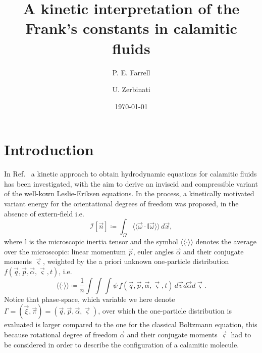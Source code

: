 \documentclass[%
 aip,
 amsmath,amssymb,
 reprint,%
]{revtex4-1}
\newcommand{\cchevrons}[1]{\langle\!\langle #1 \rangle\!\rangle}
\begin{document}

\title[]{A kinetic interpretation of the Frank's constants in calamitic fluids}
\author{P. E. Farrell}
\author{U. Zerbinati}

\date{\today}%

\begin{abstract}
\end{abstract}

\maketitle

\section{\label{sec:intro}Introduction}
In Ref.~ a kinetic approach to obtain hydrodynamic equations for calamitic fluids has been investigated, with the aim to derive an inviscid and compressible variant of the well-kown Leslie-Eriksen equations.
In the process, a kinetically motivated variant energy for the orientational degrees of freedom was proposed, in the absence of extern-field i.e.
\begin{equation}
\label{eq:OseenFrankGen}
\mathcal{I}[\vec{n}]\coloneqq \int_{\Omega} \cchevrons{\vec{\omega} \cdot \mathbb{I}\vec{\omega}}\,d\vec{x},
\end{equation}
where $\mathbb{I}$ is the microscopic inertia tensor and the symbol $\cchevrons{\cdot}$ denotes the average over the microscopic: linear momentum $\vec{p}$, euler angles $\vec{\alpha}$ and their conjugate moments $\vec{\varsigma}$, weighted by the a priori unknown one-particle distribution $f(\vec{q},\vec{p},\vec{\alpha},\vec{\varsigma},t)$, i.e.~
\begin{equation}
	\cchevrons{\cdot} \coloneqq \frac{1}{n}\int\!\!\!\int\!\!\!\int\psi\,f({\vec{q}},\vec{p},\vec{\alpha},\vec{\varsigma},t)\,d\vec{v}d\vec{\alpha}d\vec{\varsigma}.
\end{equation}
Notice that phase-space, which variable we here denote $\Gamma=(\vec{\xi},\vec{\pi})=(\vec{q},\vec{p},\vec{\alpha},\vec{\varsigma})$, over which the one-particle distribution is evaluated is larger compared to the one for the classical Boltzmann equation, this because rotational degree of freedom $\vec{\alpha}$ and their conjugate moments $\vec{\varsigma}$ had to be considered in order to describe the configuration of a calamitic molecule.
\end{document}
